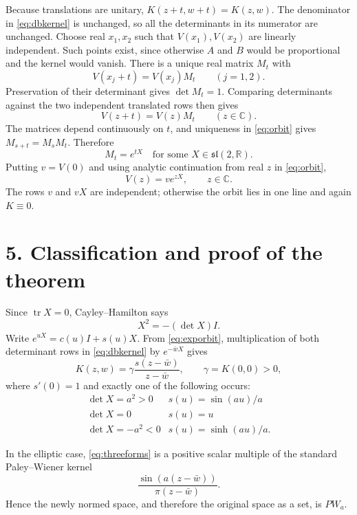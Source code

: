 \documentclass[11pt]{article}
\newcommand{\C}{\mathbb C}
\newcommand{\R}{\mathbb R}
\newcommand{\PW}{PW}
\begin{document}
Because translations are unitary,
$K(z+t,w+t)=K(z,w)$.  The denominator in \eqref{eq:dbkernel} is unchanged,
so all the determinants in its numerator are unchanged.  Choose real
$x_1,x_2$ such that $V(x_1),V(x_2)$ are linearly independent.  Such points
exist, since otherwise $A$ and $B$ would be proportional and the kernel would
vanish.  There is a unique real matrix $M_t$ with
\[
 V(x_j+t)=V(x_j)M_t\qquad(j=1,2).
\]
Preservation of their determinant gives $\det M_t=1$.  Comparing determinants
against the two independent translated rows then gives
\begin{equation}\label{eq:orbit}
 V(z+t)=V(z)M_t\qquad(z\in\C).
\end{equation}
The matrices depend continuously on $t$, and uniqueness in
\eqref{eq:orbit} gives $M_{s+t}=M_sM_t$.  Therefore
\[
 M_t=e^{tX}\quad\text{for some }X\in\mathfrak{sl}(2,\R).
\]
Putting $v=V(0)$ and using analytic continuation from real $z$ in
\eqref{eq:orbit},
\begin{equation}\label{eq:exporbit}
 V(z)=ve^{zX},\qquad z\in\C.
\end{equation}
The rows $v$ and $vX$ are independent; otherwise the orbit lies in one line
and again $K\equiv0$.

\section*{5. Classification and proof of the theorem}

Since $\operatorname{tr}X=0$, Cayley--Hamilton says
\[
 X^2=-(\det X)I.
\]
Write $e^{uX}=c(u)I+s(u)X$.  From \eqref{eq:exporbit}, multiplication of both
determinant rows in \eqref{eq:dbkernel} by $e^{-\bar wX}$ gives
\begin{equation}\label{eq:threeforms}
 K(z,w)=\gamma\frac{s(z-\bar w)}{z-\bar w},
 \qquad \gamma=K(0,0)>0,
\end{equation}
where $s'(0)=1$ and exactly one of the following occurs:
\[
\begin{array}{c|c}
\det X=a^2>0&s(u)=\sin(au)/a\\[2mm]
\det X=0&s(u)=u\\[2mm]
\det X=-a^2<0&s(u)=\sinh(au)/a.
\end{array}
\]

In the elliptic case, \eqref{eq:threeforms} is a positive scalar multiple of
the standard Paley--Wiener kernel
\[
 \frac{\sin(a(z-\bar w))}{\pi(z-\bar w)}.
\]
Hence the newly normed space, and therefore the original space as a set, is
$\PW_a$.
\end{document}
